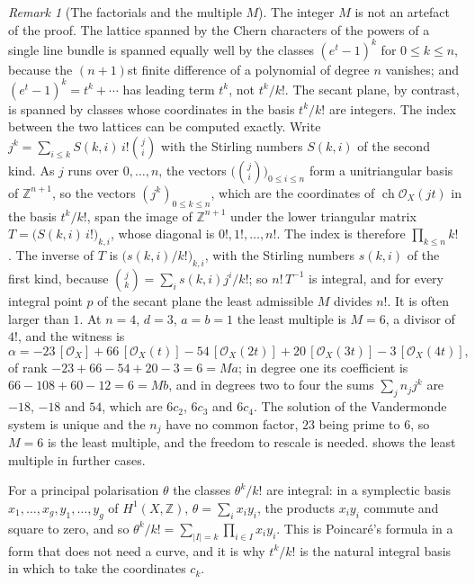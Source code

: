 \documentclass[11pt,reqno]{amsart}
\theoremstyle{plain}
\theoremstyle{definition}
\theoremstyle{remark}
\newtheorem{remark}[theorem]{Remark}
\newcommand{\ZZ}{\mathbb{Z}}
\newcommand{\cO}{\mathcal{O}}
\DeclareMathOperator{\ch}{ch}
\begin{document}
\begin{remark}[The factorials and the multiple $M$]%
\label{rem:themultiple}
The integer $M$ is not an artefact of the proof. The lattice spanned by the
Chern characters of the powers of a single line bundle is spanned equally well
by the classes $(e^{t}-1)^{k}$ for $0\le k\le n$, because the $(n+1)$st finite
difference of a polynomial of degree $n$ vanishes; and $(e^{t}-1)^{k}=t^{k}+
\cdots$ has leading term $t^{k}$, not $t^{k}/k!$. The secant plane, by
contrast, is spanned by classes whose coordinates in the basis $t^{k}/k!$ are
integers. The index between the two lattices can be computed exactly. Write
$j^{k}=\sum_{i\le k}S(k,i)\,i!\binom{j}{i}$ with the Stirling numbers $S(k,i)$
of the second kind. As $j$ runs over $0,\dots,n$, the vectors
$\bigl(\binom{j}{i}\bigr)_{0\le i\le n}$ form a unitriangular basis of
$\ZZ^{n+1}$, so the vectors $(j^{k})_{0\le k\le n}$, which are the coordinates
of $\ch\cO_{X}(jt)$ in the basis $t^{k}/k!$, span the image of $\ZZ^{n+1}$
under the lower triangular matrix $T=\bigl(S(k,i)\,i!\bigr)_{k,i}$, whose
diagonal is $0!,1!,\dots,n!$. The index is therefore $\prod_{k\le n}k!$. The
inverse of $T$ is $\bigl(s(k,i)/k!\bigr)_{k,i}$, with the Stirling numbers
$s(k,i)$ of the first kind, because $\binom{j}{k}=\sum_{i}s(k,i)j^{i}/k!$;
so $n!\,T^{-1}$ is integral, and for every integral point $p$ of the secant
plane the least admissible $M$ divides $n!$. It is often larger than $1$. At $n=4$, $d=3$, $a=b=1$ the least multiple is $M=6$,
a divisor of $4!$, and the witness is
\[
  \alpha=-23\,[\cO_{X}]+66\,[\cO_{X}(t)]-54\,[\cO_{X}(2t)]
         +20\,[\cO_{X}(3t)]-3\,[\cO_{X}(4t)],
\]
of rank $-23+66-54+20-3=6=Ma$; in degree one its coefficient is
$66-108+60-12=6=Mb$, and in degrees two to four the sums
$\sum_{j}n_{j}j^{k}$ are $-18$, $-18$ and $54$, which are $6c_{2}$, $6c_{3}$ and
$6c_{4}$. The solution of the Vandermonde system is unique and the $n_{j}$
have no common factor, $23$ being prime to $6$, so $M=6$ is the least
multiple, and the freedom to rescale is needed.  shows
the least multiple in further cases.

For a principal polarisation $\theta$ the classes $\theta^{k}/k!$ are
integral: in a symplectic basis $x_{1},\dots,x_{g},y_{1},\dots,y_{g}$ of
$H^{1}(X,\ZZ)$, $\theta=\sum_{i}x_{i}y_{i}$, the products $x_{i}y_{i}$
commute and square to zero, and so
$\theta^{k}/k!=\sum_{|I|=k}\prod_{i\in I}x_{i}y_{i}$. This is Poincar\'e's
formula in a form that does not need a curve, and it is why $t^{k}/k!$ is the
natural integral basis in which to take the coordinates $c_{k}$.
\end{remark}
\end{document}
